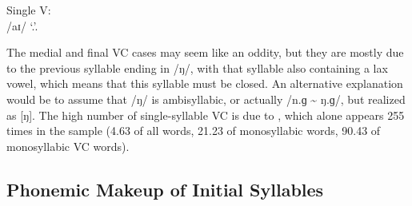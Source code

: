 	\a Single V:\\
		 /aɪ/ `\Fsg{}.\Top{}'.
\xe

The medial and final VC cases may seem like an oddity, but they are mostly due 
to the previous syllable ending in /ŋ/, with that syllable also containing a 
lax vowel, which means that this syllable must be closed. An alternative 
explanation would be to assume that /ŋ/ is ambisyllabic, or actually /n.ɡ 
\textasciitilde{} ŋ.ɡ/, but realized as [ŋ]. The high number of single-syllable 
VC is due to , which alone appears 255 times in the 
sample (4.63\pct{} of all words, 21.23\pct{} of monosyllabic words, 90.43\pct{} 
of monosyllabic VC words).

\subsection{Phonemic Makeup of Initial Syllables}

